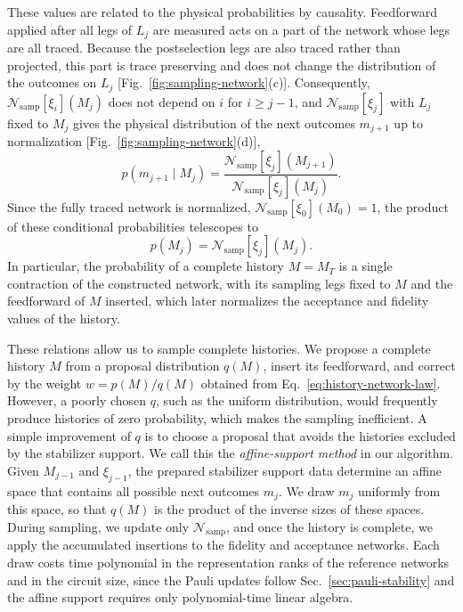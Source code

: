 \documentclass[aps,prx,twocolumn,superscriptaddress,longbibliography]{revtex4-2}
\begin{document}
These values are related to the physical probabilities by causality.
Feedforward applied after all legs of $L_j$ are measured acts on a part of the network whose legs are all traced.
Because the postselection legs are also traced rather than projected,
this part is trace preserving and does not change the distribution of the outcomes on $L_j$
[Fig.~\ref{fig:sampling-network}(c)].
Consequently, $\mathcal N_{\text{samp}}[\xi_i](M_j)$ does not depend on $i$ for $i\ge j-1$,
and $\mathcal N_{\text{samp}}[\xi_j]$ with $L_j$ fixed to $M_j$ gives the physical distribution
of the next outcomes $m_{j+1}$ up to normalization [Fig.~\ref{fig:sampling-network}(d)],
\begin{equation}
      p(m_{j+1}\mid M_j)=\frac{\mathcal N_{\text{samp}}[\xi_j](M_{j+1})}{\mathcal N_{\text{samp}}[\xi_j](M_j)}.
      \label{eq:history-conditional}
\end{equation}
Since the fully traced network is normalized, $\mathcal N_{\text{samp}}[\xi_0](M_0)=1$,
the product of these conditional probabilities telescopes to
\begin{equation}
      p(M_j)=\mathcal N_{\text{samp}}[\xi_j](M_j).
      \label{eq:history-network-law}
\end{equation}
In particular, the probability of a complete history $M=M_T$ is a single contraction
of the constructed network, with its sampling legs fixed to $M$ and the feedforward of $M$ inserted,
which later normalizes the acceptance and fidelity values of the history.

These relations allow us to sample complete histories.
We propose a complete history $M$ from a proposal distribution $q(M)$,
insert its feedforward, and correct by the weight $w=p(M)/q(M)$
obtained from Eq.~\eqref{eq:history-network-law}.
However, a poorly chosen $q$, such as the uniform distribution,
would frequently produce histories of zero probability,
which makes the sampling inefficient.
A simple improvement of $q$ is to choose a proposal that avoids
the histories excluded by the stabilizer support.
We call this the \emph{affine-support method} in our algorithm.
Given $M_{j-1}$ and $\xi_{j-1}$, the prepared stabilizer support data determine
an affine space that contains all possible next outcomes $m_j$.
We draw $m_j$ uniformly from this space,
so that $q(M)$ is the product of the inverse sizes of these spaces.
During sampling, we update only $\mathcal N_{\text{samp}}$,
and once the history is complete, we apply the accumulated insertions to the fidelity and acceptance networks.
Each draw costs time polynomial in the representation ranks of the reference networks and in the circuit size,
since the Pauli updates follow Sec.~\ref{sec:pauli-stability}
and the affine support requires only polynomial-time linear algebra.
\end{document}
